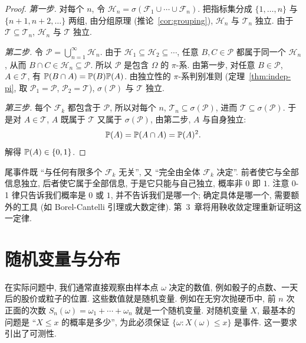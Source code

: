 \begin{proof}
\emph{第一步.} 对每个 $n$, 令 $\mathcal{H}_n=\sigma(\mathcal{F}_1\cup\cdots\cup\mathcal{F}_n)$. 把指标集分成 $\{1,\dots,n\}$ 与 $\{n+1,n+2,\dots\}$ 两组, 由分组原理 (推论~\ref{cor:grouping}), $\mathcal{H}_n$ 与 $\mathcal{T}_n$ 独立. 由于 $\mathcal{T}\subseteq\mathcal{T}_n$, $\mathcal{H}_n$ 与 $\mathcal{T}$ 独立.

\emph{第二步.} 令 $\mathcal{P}=\bigcup_{n=1}^\infty\mathcal{H}_n$. 由于 $\mathcal{H}_1\subseteq\mathcal{H}_2\subseteq\cdots$, 任意 $B,C\in\mathcal{P}$ 都属于同一个 $\mathcal{H}_n$, 从而 $B\cap C\in\mathcal{H}_n\subseteq\mathcal{P}$. 所以 $\mathcal{P}$ 是包含 $\Omega$ 的 $\pi$-系. 由第一步, 对任意 $B\in\mathcal{P}$, $A\in\mathcal{T}$, 有 $\P(B\cap A)=\P(B)\P(A)$. 由独立性的 $\pi$-系判别准则 (定理~\ref{thm:indep-pi}, 取 $\mathcal{P}_1=\mathcal{P}$, $\mathcal{P}_2=\mathcal{T}$), $\sigma(\mathcal{P})$ 与 $\mathcal{T}$ 独立.

\emph{第三步.} 每个 $\mathcal{F}_k$ 都包含于 $\mathcal{P}$, 所以对每个 $n$, $\mathcal{T}_n\subseteq\sigma(\mathcal{P})$, 进而 $\mathcal{T}\subseteq\sigma(\mathcal{P})$. 于是对 $A\in\mathcal{T}$, $A$ 既属于 $\mathcal{T}$ 又属于 $\sigma(\mathcal{P})$, 由第二步, $A$ 与自身独立:
\[
\P(A)=\P(A\cap A)=\P(A)^2.
\]
解得 $\P(A)\in\{0,1\}$.
\end{proof}

\begin{intuition}
尾事件既 ``与任何有限多个 $\mathcal{F}_k$ 无关'', 又 ``完全由全体 $\mathcal{F}_k$ 决定''. 前者使它与全部信息独立, 后者使它属于全部信息, 于是它只能与自己独立, 概率非 $0$ 即 $1$. 注意 0-1 律只告诉我们概率是 $0$ 或 $1$, 并不告诉我们是哪一个; 确定具体是哪一个, 需要额外的工具 (如 Borel-Cantelli 引理或大数定律). 第~3~章将用鞅收敛定理重新证明这一定律.
\end{intuition}

\section{随机变量与分布}
\label{sec:1-2}

在实际问题中, 我们通常直接观察由样本点 $\omega$ 决定的数值, 例如骰子的点数、一天后的股价或粒子的位置. 这些数值就是随机变量. 例如在无穷次抛硬币中, 前 $n$ 次正面的次数 $S_n(\omega)=\omega_1+\cdots+\omega_n$ 就是一个随机变量. 对随机变量 $X$, 最基本的问题是 ``$X\le x$ 的概率是多少'', 为此必须保证 $\{\omega: X(\omega)\le x\}$ 是事件. 这一要求引出了可测性.

